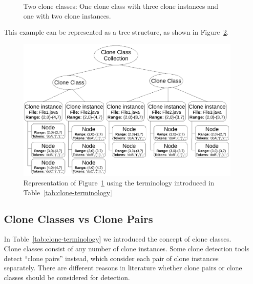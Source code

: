 \begin{figure}[H]
\begin{parcolumns}{3}
\end{parcolumns}
\caption{Two clone classes: One clone class with three clone instances and one with two clone instances.}
\label{fig:cloneclasses}
\end{figure}

This example can be represented as a tree structure, as shown in Figure~\ref{fig:terminologyexample}.

\begin{figure}[H]
  \includegraphics[width=1\columnwidth]{img/TerminologyExample}
  \caption{Representation of Figure~\ref{fig:cloneclasses} using the terminology introduced in Table~\ref{tab:clone-terminology}}
  \label{fig:terminologyexample}
\end{figure}

\subsection{Clone Classes vs Clone Pairs}\label{sec:classesvspairs}
In Table~\ref{tab:clone-terminology} we introduced the concept of clone classes. Clone classes consist of any number of clone instances. Some clone detection tools detect ``clone pairs'' instead, which consider each pair of clone instances separately. There are different reasons in literature whether clone pairs or clone classes should be considered for detection.

